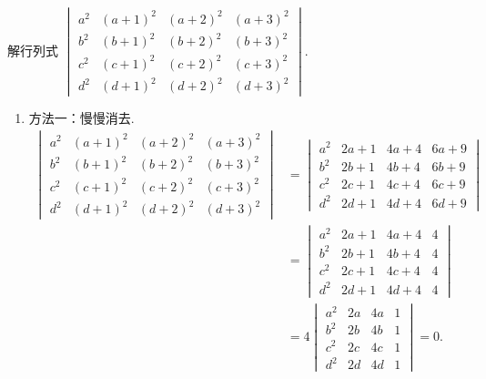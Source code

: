 \begin{exercise}
\begin{exgroup}
        \item 解行列式 $ \begin{vmatrix}
                a^{2} & (a+1)^{2} & (a+2)^{2} & (a+3)^{2} \\
                b^{2} & (b+1)^{2} & (b+2)^{2} & (b+3)^{2} \\
                c^{2} & (c+1)^{2} & (c+2)^{2} & (c+3)^{2} \\
                d^{2} & (d+1)^{2} & (d+2)^{2} & (d+3)^{2}
            \end{vmatrix} $.
        \begin{answer}
            \begin{enumerate}
                \item 方法一：慢慢消去.
                      \begin{align*}
                          \begin{vmatrix}
                              a^{2} & (a+1)^{2} & (a+2)^{2} & (a+3)^{2} \\
                              b^{2} & (b+1)^{2} & (b+2)^{2} & (b+3)^{2} \\
                              c^{2} & (c+1)^{2} & (c+2)^{2} & (c+3)^{2} \\
                              d^{2} & (d+1)^{2} & (d+2)^{2} & (d+3)^{2}
                          \end{vmatrix}
                           & = \begin{vmatrix}
                                   a^{2} & 2a+1 & 4a+4 & 6a+9 \\
                                   b^{2} & 2b+1 & 4b+4 & 6b+9 \\
                                   c^{2} & 2c+1 & 4c+4 & 6c+9 \\
                                   d^{2} & 2d+1 & 4d+4 & 6d+9
                               \end{vmatrix} \\
                           & = \begin{vmatrix}
                                   a^{2} & 2a+1 & 4a+4 & 4 \\
                                   b^{2} & 2b+1 & 4b+4 & 4 \\
                                   c^{2} & 2c+1 & 4c+4 & 4 \\
                                   d^{2} & 2d+1 & 4d+4 & 4
                               \end{vmatrix}    \\
                           & = 4\begin{vmatrix}
                                    a^{2} & 2a & 4a & 1 \\
                                    b^{2} & 2b & 4b & 1 \\
                                    c^{2} & 2c & 4c & 1 \\
                                    d^{2} & 2d & 4d & 1
                                \end{vmatrix}=0.
                      \end{align*}


\end{enumerate}
\end{answer}
\end{exgroup}
\end{exercise}
